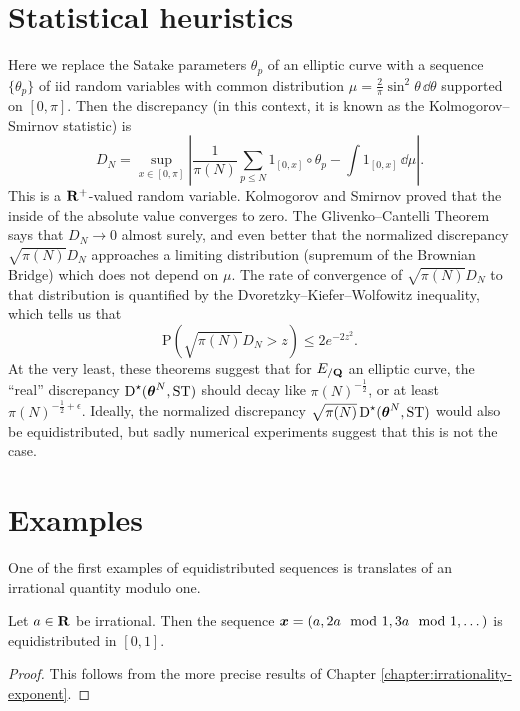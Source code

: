\section{Statistical heuristics}

Here we replace the Satake parameters $\theta_p$ of an elliptic curve with 
a sequence $\{\theta_p\}$ of iid random variables with common distribution 
$\mu = \frac{2}{\pi} \sin^2 \theta\, \dd\theta$ supported on $[0,\pi]$. Then 
the discrepancy (in this context, it is known as the Kolmogorov--Smirnov 
statistic) is 
\[
	D_N = \sup_{x\in [0,\pi]} \left|\frac{1}{\pi(N)} \sum_{p\leqslant N} 1_{[0,x]}\circ \theta_p - \int 1_{[0,x]}\, \dd\mu\right| .
\]
This is a $\mathbf{R}^+$-valued random variable. Kolmogorov and Smirnov proved that 
the inside of the absolute value converges to zero. The Glivenko--Cantelli 
Theorem says that $D_N \to 0$ almost surely, and even better that the 
normalized discrepancy $\sqrt{\pi(N)} D_N$ approaches a limiting distribution 
(supremum of the Brownian Bridge) which does not depend on $\mu$. The rate of 
convergence of $\sqrt{\pi(N)} D_N$ to that distribution is quantified by the 
Dvoretzky--Kiefer--Wolfowitz inequality, which tells us that 
\[
	\mathrm{P}\left(\sqrt{\pi(N)} D_N > z\right) \leqslant 2 e^{-2 z^2} .
\]
At the very least, these theorems suggest that for $E_{/\mathbf{Q}}$ an elliptic 
curve, the ``real'' discrepancy $\operatorname{D}^\star({\boldsymbol\theta}^N,\mathrm{ST})$ should decay 
like $\pi(N)^{-\frac 1 2}$, or at least $\pi(N)^{-\frac 1 2+\epsilon}$. 
Ideally, the normalized discrepancy $\sqrt{\pi(N)}\operatorname{D}^\star({\boldsymbol\theta}^N,\mathrm{ST})$ 
would also be equidistributed, but sadly numerical experiments suggest that 
this is not the case. 





\section{Examples}

One of the first examples of equidistributed sequences is translates of an 
irrational quantity modulo one. 

\begin{theorem}
Let $a\in \mathbf{R}$ be irrational. Then the sequence 
${\boldsymbol x}=(a,2a\mod 1,3a\mod 1,\dots)$ is equidistributed in $[0,1]$. 
\end{theorem}
\begin{proof}
This follows from the more precise results of Chapter 
\ref{chapter:irrationality-exponent}. 
\end{proof}

